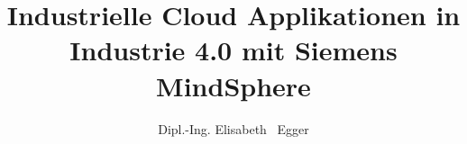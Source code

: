 \documentclass[bachelor,german]{hgbthesis}
\title{Industrielle Cloud Applikationen in Industrie 4.0 mit Siemens MindSphere}
\author{Dipl.-Ing. Elisabeth \ Egger}
\begin{document}

\frontmatter                    %

\maketitle
\tableofcontents

		
			

\mainmatter          %









\appendix                                            %


\MakeBibliography                        %

%

\end{document}
